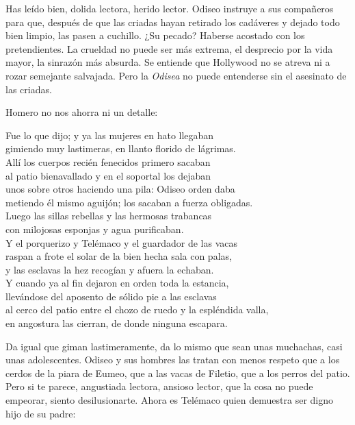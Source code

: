 Has leído bien, dolida lectora, herido lector. Odiseo instruye a sus compañeros para que, después de que las criadas hayan retirado los cadáveres y dejado todo bien limpio, las pasen a cuchillo. ¿Su pecado? Haberse acostado con los pretendientes. La crueldad no puede ser más extrema, el desprecio por la vida mayor, la sinrazón más absurda. Se entiende que Hollywood no se atreva ni a rozar semejante salvajada. Pero la \emph{Odisea} no puede entenderse sin el asesinato de las criadas.

Homero no nos ahorra ni un detalle:

\begin{versocita}
Fue lo que dijo; y ya las mujeres en hato llegaban\\
gimiendo muy lastimeras, en llanto florido de lágrimas.\\
Allí los cuerpos recién fenecidos primero sacaban\\
al patio bienavallado y en el soportal los dejaban\\
unos sobre otros haciendo una pila: Odiseo orden daba\\
metiendo él mismo aguijón; los sacaban a fuerza obligadas.\\
Luego las sillas rebellas y las hermosas trabancas\\
con milojosas esponjas y agua purificaban.\\
Y el porquerizo y Telémaco y el guardador de las vacas\\
raspan a frote el solar de la bien hecha sala con palas,\\
y las esclavas la hez recogían y afuera la echaban.\\
Y cuando ya al fin dejaron en orden toda la estancia,\\
llevándose del aposento de sólido pie a las esclavas\\
al cerco del patio entre el chozo de ruedo y la espléndida valla,\\
en angostura las cierran, de donde ninguna escapara.
\end{versocita}

Da igual que giman lastimeramente, da lo mismo que sean unas muchachas, casi unas adolescentes. Odiseo y sus hombres las tratan con menos respeto que a los cerdos de la piara de Eumeo, que a las vacas de Filetio, que a los perros del patio. Pero si te parece, angustiada lectora, ansioso lector, que la cosa no puede empeorar, siento desilusionarte. Ahora es Telémaco quien demuestra ser digno hijo de su padre:

